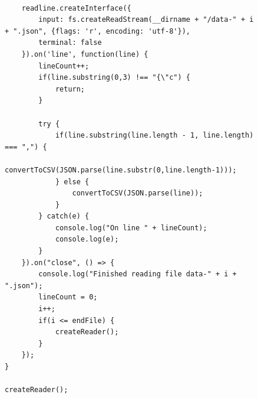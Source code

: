 \documentclass[prodmode]{acmsmall} %
\begin{document}
\begin{figure}[!t]
    \begin{lstlisting}

    readline.createInterface({
        input: fs.createReadStream(__dirname + "/data-" + i + ".json", {flags: 'r', encoding: 'utf-8'}),
        terminal: false
    }).on('line', function(line) {
        lineCount++;
        if(line.substring(0,3) !== "{\"c") {
            return;
        }

        try {
            if(line.substring(line.length - 1, line.length) === ",") {
                convertToCSV(JSON.parse(line.substr(0,line.length-1)));
            } else {
                convertToCSV(JSON.parse(line));
            }
        } catch(e) {
            console.log("On line " + lineCount);
            console.log(e);
        }
    }).on("close", () => {
        console.log("Finished reading file data-" + i + ".json");
        lineCount = 0;
        i++;
        if(i <= endFile) {
            createReader();
        }
    });
}

createReader();
\end{lstlisting}
\end{figure}
\end{document}
